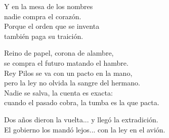 \begin{lyrics}
Y en la mesa de los nombres\\
nadie compra el corazón.\\
Porque el orden que se inventa\\
también paga su traición.

Reino de papel, corona de alambre,\\
se compra el futuro matando el hambre.\\
Rey Pilos se va con un pacto en la mano,\\
pero la ley no olvida la sangre del hermano.\\
Nadie se salva, la cuenta es exacta:\\
cuando el pasado cobra, la tumba es la que pacta.

Dos años dieron la vuelta... %
y llegó la extradición.\\
El gobierno los mandó lejos... %
con la ley en el avión.

\end{lyrics}

